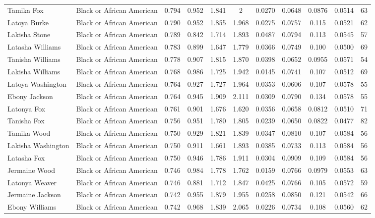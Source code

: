 \documentclass[]{article}
\begin{document}
\begin{tabular}{lcccccccccc}
Tamika Fox & Black or African American & 0.794 & 0.952 & 1.841 & 2 & 0.0270 & 0.0648 & 0.0876 & 0.0514 & 63 \\
Latoya Burke & Black or African American & 0.790 & 0.952 & 1.855 & 1.968 & 0.0275 & 0.0757 & 0.115 & 0.0521 & 62 \\
Lakisha Stone & Black or African American & 0.789 & 0.842 & 1.714 & 1.893 & 0.0487 & 0.0794 & 0.113 & 0.0545 & 57 \\
Latasha Williams & Black or African American & 0.783 & 0.899 & 1.647 & 1.779 & 0.0366 & 0.0749 & 0.100 & 0.0500 & 69 \\
Tanisha Williams & Black or African American & 0.778 & 0.907 & 1.815 & 1.870 & 0.0398 & 0.0652 & 0.0955 & 0.0571 & 54 \\
Lakisha Williams & Black or African American & 0.768 & 0.986 & 1.725 & 1.942 & 0.0145 & 0.0741 & 0.107 & 0.0512 & 69 \\
Latoya Washington & Black or African American & 0.764 & 0.927 & 1.727 & 1.964 & 0.0353 & 0.0606 & 0.107 & 0.0578 & 55 \\
Ebony Jackson & Black or African American & 0.764 & 0.945 & 1.909 & 2.111 & 0.0309 & 0.0790 & 0.134 & 0.0578 & 55 \\
Latonya Fox & Black or African American & 0.761 & 0.901 & 1.676 & 1.620 & 0.0356 & 0.0658 & 0.0812 & 0.0510 & 71 \\
Tanisha Fox & Black or African American & 0.756 & 0.951 & 1.780 & 1.805 & 0.0239 & 0.0650 & 0.0822 & 0.0477 & 82 \\
Tamika Wood & Black or African American & 0.750 & 0.929 & 1.821 & 1.839 & 0.0347 & 0.0810 & 0.107 & 0.0584 & 56 \\
Lakisha Washington & Black or African American & 0.750 & 0.911 & 1.661 & 1.893 & 0.0385 & 0.0733 & 0.113 & 0.0584 & 56 \\
Latasha Fox & Black or African American & 0.750 & 0.946 & 1.786 & 1.911 & 0.0304 & 0.0909 & 0.109 & 0.0584 & 56 \\
Jermaine Wood & Black or African American & 0.746 & 0.984 & 1.778 & 1.762 & 0.0159 & 0.0766 & 0.0979 & 0.0553 & 63 \\
Latonya Weaver & Black or African American & 0.746 & 0.881 & 1.712 & 1.847 & 0.0425 & 0.0766 & 0.105 & 0.0572 & 59 \\
Jermaine Jackson & Black or African American & 0.742 & 0.955 & 1.879 & 1.955 & 0.0258 & 0.0850 & 0.121 & 0.0542 & 66 \\
Ebony Williams & Black or African American & 0.742 & 0.968 & 1.839 & 2.065 & 0.0226 & 0.0734 & 0.108 & 0.0560 & 62 \\

\end{tabular}
\end{document}
